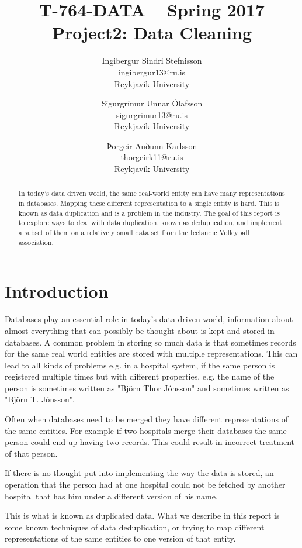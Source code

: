 \documentclass[tog]{acmsiggraph}
\title{T-764-DATA – Spring 2017\\
Project2: Data Cleaning}
\author{Ingibergur Sindri Stefnisson\\ingibergur13@ru.is\\Reykjavík University \and Sigurgrímur Unnar Ólafsson\\sigurgrimur13@ru.is\\Reykjavík University \and Þorgeir Auðunn Karlsson\\thorgeirk11@ru.is\\Reykjavík University}
\begin{document}
\maketitle

\begin{abstract}
    In today's data driven world, the same real-world entity can have many representations in databases. Mapping these different representation to a single entity is hard. This is known as data duplication and is a problem in the industry. The goal of this report is to explore ways to deal with data duplication, known as deduplication, and implement a subset of them on a relatively small data set from the Icelandic Volleyball association.
\end{abstract}

\keywordlist

\section{Introduction}
Databases play an essential role in today's data driven world, information about almost everything that can possibly be thought about is kept and stored in databases. A common problem in storing so much data is that sometimes records for the same real world entities are stored with multiple representations. This can lead to all kinds of problems e.g. in a hospital system, if the same person is registered multiple times but with different properties, e.g. the name of the person is sometimes written as "Björn Thor Jónsson" and sometimes written as "Björn T. Jónsson".

Often when databases need to be merged they have different representations of the same entities. For example if two hospitals merge their databases the same person could end up having two records. This could result in incorrect treatment of that person.

If there is no thought put into implementing the way the data is stored, an operation that the person had at one hospital could not be fetched by another hospital that has him under a different version of his name.

This is what is known as duplicated data. What we describe in this report is some known techniques of data deduplication, or trying to map different representations of the same entities to one version of that entity. 


\end{document}
